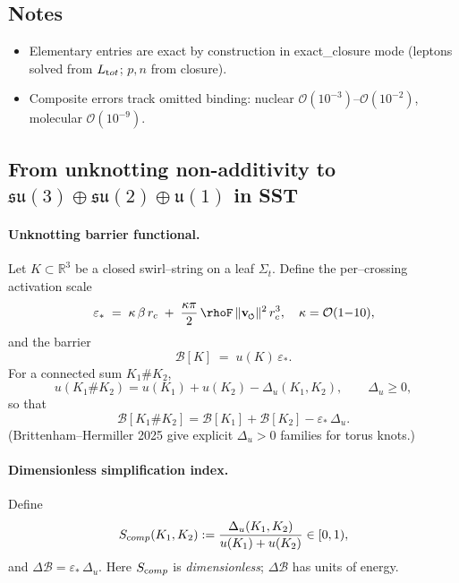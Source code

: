 \documentclass[11pt]{article}
\begin{document}
\subsection*{Notes}
\begin{itemize}
\item Elementary entries are exact by construction in exact\_closure mode (leptons solved from $L_{\textrm tot}$; $p,n$ from closure).
\item Composite errors track omitted binding: nuclear $\mathcal O(10^{-3})$–$\mathcal O(10^{-2})$, molecular $\mathcal O(10^{-9})$.
\end{itemize}


\subsection*{From unknotting non-additivity to \(\mathfrak{su}(3)\oplus\mathfrak{su}(2)\oplus\mathfrak u(1)\) in SST}

\paragraph{Unknotting barrier functional.}
    Let \(K\subset\mathbb R^3\) be a closed swirl–string on a leaf \(\Sigma_t\).
    Define the per–crossing activation scale
    \[
        \varepsilon_*\;=\;\kappa\,\beta\,\rc\;+\;\frac{\kappa\pi}{2}\,\rhoF\,\vnorm^2\,\rc^3,
        \quad \kappa=\mathcal O(1{-}10),
    \]
    and the barrier
    \[
        \mathcal B[K]\;=\;u(K)\,\varepsilon_*.
    \]
    For a connected sum \(K_1\#K_2\),
    \[
        u(K_1\#K_2)=u(K_1)+u(K_2)-\Delta_u(K_1,K_2),\qquad \Delta_u\ge 0,
    \]
    so that
    \[
        \mathcal B[K_1\#K_2]=\mathcal B[K_1]+\mathcal B[K_2]-\varepsilon_*\,\Delta_u.
    \]
    (Brittenham–Hermiller 2025 give explicit \(\Delta_u>0\) families for torus knots.)

\paragraph{Dimensionless simplification index.}
    Define
    \[
        S_{\textrm comp}(K_1,K_2):=\frac{\Delta_u(K_1,K_2)}{u(K_1)+u(K_2)}\in[0,1),
    \]
    and \(\Delta\mathcal B=\varepsilon_*\,\Delta_u\). Here \(S_{\textrm comp}\) is \emph{dimensionless}; \(\Delta\mathcal B\) has units of energy.
\end{document}
